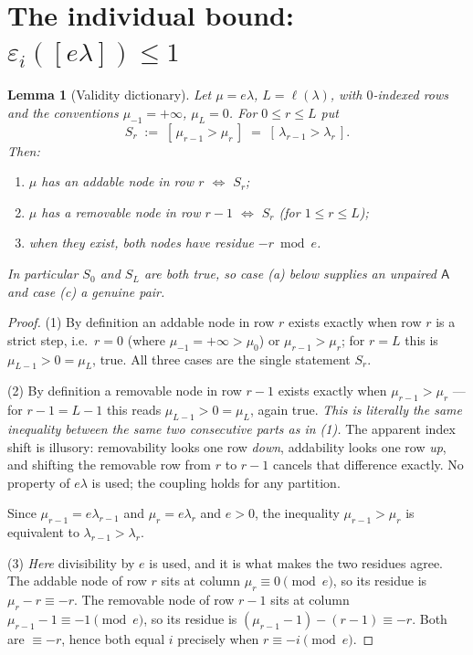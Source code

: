 \documentclass[11pt]{article}
\newtheorem{lemma}[theorem]{Lemma}
\theoremstyle{definition}
\newcommand{\eps}{\varepsilon}
\newcommand{\Aa}{{\mathsf A}}
\begin{document}
\section{The individual bound: $\eps_i([e\lambda]) \le 1$}\label{sec:individual}

\begin{lemma}[Validity dictionary]\label{lem:Sr}
Let $\mu = e\lambda$, $L = \ell(\lambda)$, with $0$-indexed rows and the
conventions $\mu_{-1} = +\infty$, $\mu_L = 0$. For $0 \le r \le L$ put
\[
  S_r \;:=\; [\, \mu_{r-1} > \mu_r \,] \;=\; [\, \lambda_{r-1} > \lambda_r \,].
\]
Then:
\begin{enumerate}
  \item $\mu$ has an addable node in row $r$ $\iff$ $S_r$;
  \item $\mu$ has a removable node in row $r-1$ $\iff$ $S_r$ \quad
        (for $1 \le r \le L$);
  \item when they exist, both nodes have residue $-r \bmod e$.
\end{enumerate}
In particular $S_0$ and $S_L$ are both \emph{true}, so case (a) below
supplies an unpaired $\Aa$ and case (c) a genuine pair.
\end{lemma}

\begin{proof}
(1) By definition an addable node in row $r$ exists exactly when row $r$ is
a strict step, i.e.\ $r = 0$ (where $\mu_{-1} = +\infty > \mu_0$) or
$\mu_{r-1} > \mu_r$; for $r = L$ this is $\mu_{L-1} > 0 = \mu_L$, true. All
three cases are the single statement $S_r$.

(2) By definition a removable node in row $r-1$ exists exactly when
$\mu_{r-1} > \mu_{r}$ --- for $r - 1 = L-1$ this reads
$\mu_{L-1} > 0 = \mu_L$, again true. \emph{This is literally the same
inequality between the same two consecutive parts as in (1).} The apparent
index shift is illusory: removability looks one row \emph{down}, addability
looks one row \emph{up}, and shifting the removable row from $r$ to $r-1$
cancels that difference exactly. No property of $e\lambda$ is used; the
coupling holds for any partition.

Since $\mu_{r-1} = e\lambda_{r-1}$ and $\mu_r = e\lambda_r$ and $e > 0$, the
inequality $\mu_{r-1} > \mu_r$ is equivalent to $\lambda_{r-1} > \lambda_r$.

(3) \emph{Here} divisibility by $e$ is used, and it is what makes the two
residues agree. The addable node of row $r$ sits at column $\mu_r \equiv 0
\pmod e$, so its residue is $\mu_r - r \equiv -r$. The removable node of row
$r-1$ sits at column $\mu_{r-1} - 1 \equiv -1 \pmod e$, so its residue is
$(\mu_{r-1}-1)-(r-1) \equiv -r$. Both are $\equiv -r$, hence both equal $i$
precisely when $r \equiv -i \pmod e$.
\end{proof}
\end{document}
